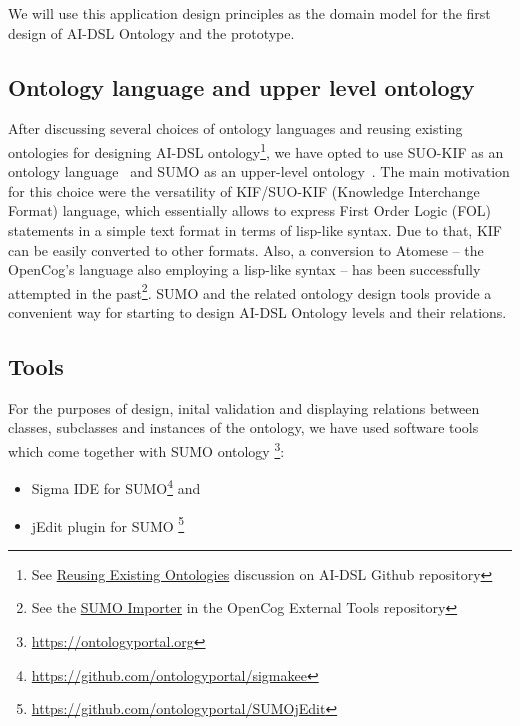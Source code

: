 \documentclass[]{report}
\begin{document}
We will use this application design principles as the domain model for the first
design of AI-DSL Ontology and the prototype.

\subsection{Ontology language and upper level ontology}

After discussing several choices of ontology languages and reusing existing
ontologies for designing AI-DSL ontology\footnote{See
\href{https://github.com/singnet/ai-dsl/discussions/18}{Reusing Existing
Ontologies} discussion on AI-DSL Github repository\cite{AIDSLRepo}}, we have opted to
use SUO-KIF as an ontology language~\cite{pease_standard_2009} and SUMO as an
upper-level ontology~\cite{NilesPease2001}. The main motivation for this choice
were the versatility of KIF/SUO-KIF (Knowledge Interchange Format) language,
which essentially allows to express First Order Logic (FOL) statements in a simple
text format in terms of lisp-like syntax. Due to that, KIF can be easily
converted to other formats\cite{kalibatiene_survey_2011}. Also, a conversion to
Atomese -- the OpenCog's language also employing a lisp-like syntax -- has been
successfully attempted in the past\footnote{See
the \href{https://github.com/opencog/external-tools/tree/master/SUMO_importer}{SUMO
  Importer} in the OpenCog External Tools
repository\cite{ExternalToolsRepo}}. SUMO and the related ontology design tools
\cite{pease_sigma_2001} provide a convenient way for starting to design AI-DSL
Ontology levels and their relations.

\subsection{Tools}

For the purposes of design, inital validation and displaying relations between
classes, subclasses and instances of the ontology, we have used software tools
which come together with SUMO ontology
\footnote{\href{https://ontologyportal.org}{https://ontologyportal.org}}:
\begin{itemize}
\item Sigma IDE for SUMO\footnote{\href{https://github.com/ontologyportal/sigmakee}
{https://github.com/ontologyportal/sigmakee}} and
\item jEdit plugin for SUMO
\footnote{\href{https://github.com/ontologyportal/SUMOjEdit}
{https://github.com/ontologyportal/SUMOjEdit}}
\end{itemize}
\end{document}
